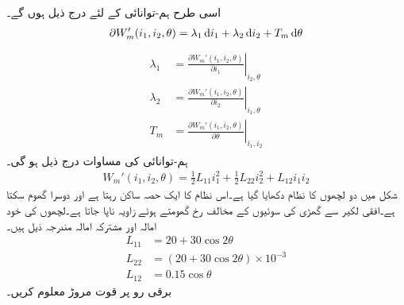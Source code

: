 اسی طرح ہم-توانائی کے لئے درج ذیل ہوں گے۔
\begin{align}
\partial W_m'(i_1,i_2,\theta)=\lambda_1 \dif i_1+\lambda_2 \dif i_2+T_m \dif \theta
\end{align}
%
\begin{gather}
\begin{aligned}\label{مساوات_تبادلہ_کوتوانائی_سے_مروڑ}
\lambda_1&=\left.\frac{\partial W_m'(i_1,i_2,\theta)}{\partial i_1} \right|_{i_2,\theta}\\
\lambda_2&=\left.\frac{\partial W_m'(i_1,i_2,\theta)}{\partial i_2} \right|_{i_1,\theta}\\
T_m&=\left.\frac{\partial W_m'(i_1,i_2,\theta)}{\partial \theta} \right|_{i_1,i_2}
\end{aligned}
\end{gather}
ہم-توانائی کی مساوات درج ذیل ہو گی۔
\begin{align}\label{مساوات_تبادلہ_کوتوانائی_از_خود}
W_m'(i_1,i_2,\theta)=\frac{1}{2} L_{11} i_1^2+\frac{1}{2} L_{22} i_2^2+L_{12} i_1 i_2
\end{align}
%
شکل   میں دو لچھوں کا نظام دکھایا گیا ہے۔اس نظام کا ایک حصہ ساکن رہتا ہے اور دوسرا گھوم سکتا ہے۔افقی لکیر سے گھڑی کی سوئیوں  کے مخالف رخ گھومتے ہوئے  زاویہ   ناپا جاتا ہے۔لچھوں کی خود امالہ اور مشترکہ امالہ مندرجہ ذیل ہیں۔
\begin{align*}
L_{11}&=20+30\cos 2 \theta\\
L_{22}&=\left(20+30\cos 2\theta \right) \times 10^{-3}\\
L_{12}&=0.15 \cos \theta
\end{align*}
 برقی رو   پر قوت مروڑ  معلوم کریں۔
